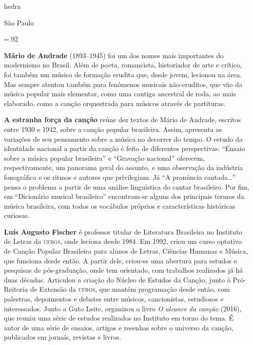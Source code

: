               \newfontfamily{}
              {\fontsize{30}{40}\selectfont \timesnewroman hedra}
              
              \medskip

              {\selectfont\minion\small
              São Paulo \quad\the\year}
\endgroup
\pagebreak

\begingroup 

\footnotesize\parindent0pt\parskip5pt\thispagestyle{empty} 
\vspace*{.1\textheight}\mbox{} \vfill
\baselineskip=.92\baselineskip
\thispagestyle{empty}

\textbf{Mário de Andrade} (1893--1945) foi um dos nomes mais importantes do modernismo no Brasil. Além de poeta, romancista, historiador de arte e crítico, foi também um músico de formação erudita que, desde jovem, lecionou na área. Mas sempre atentou também para fenômenos musicais não-eruditos, que vão da música popular mais elementar, como uma cantiga ancestral de roda, ao mais elaborado, como a canção orquestrada para músicos através de partituras.

\textbf{A estranha força da canção} reúne dez textos de Mário de Andrade, escritos entre 1930 e 1942, sobre a canção popular brasileira. Assim, apresenta as variações de seu pensamento sobre a música no decorrer do tempo.
 O estudo da identidade nacional a partir da canção é feito de diferentes perspectivas: ``Ensaio sobre a música popular brasileira'' e ``Gravação nacional'' oferecem, respectivamente, um panorama geral do assunto, e uma observação da indústria fonográfica e os ritmos e autores que privilegiam. Já ``A pronúncia cantada\ldots'' pensa o problema a partir de uma análise linguística do cantar brasileiro. Por fim, em ``Dicionário musical brasileiro'' encontram-se alguns dos principais termos da música brasileira, com todos os vocábulos próprios e características históricas curiosas.

\textbf{Luís Augusto Fischer} é professor titular de Literatura Brasileira no Instituto de Letras da \textsc{ufrgs}, onde leciona desde 1984. Em 1992, criou um curso optativo de Canção Popular Brasileira para alunos de Letras, Ciências Humanas e Música, que funciona desde então. A partir dele, criou-se uma abertura para estudos e pesquisas de pós-graduação, onde tem orientado, com trabalhos realizados já há duas décadas. Articulou a criação do Núcleo de Estudos da Canção, junto à Pró-Reitoria de Extensão da \textsc{ufrgs}, que mantém programação desde então, com palestras, depoimentos e debates entre músicos, cancionistas, estudiosos e interessados. Junto a Guto Leite, organizou o livro \textit{O alcance da canção} (2016), que reuniu uma série de estudos realizados no Instituto em torno do tema. É autor de uma série de ensaios, artigos e resenhas sobre o universo da canção, publicados em jornais, revistas e livros.

\endgroup
\pagebreak
